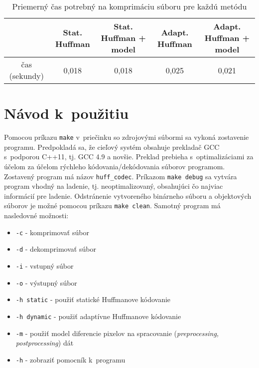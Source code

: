 \documentclass[10pt,a4paper]{article}
\begin{document}
\begin{table}[H]
	\begin{tabular}{|c|c|c|c|c|}
		\hline
		& Stat. Huffman & Stat. Huffman + model & Adapt. Huffman & Adapt. Huffman + model \\
		\hline
		čas (sekundy) & 0,018 & 0,018 & 0,025 & 0,021 \\
		\hline                            
	\end{tabular}
	\caption{Priemerný čas potrebný na komprimáciu súboru pre každú metódu}
\end{table}

\section{Návod k~použitiu}

Pomocou príkazu \texttt{make} v~priečinku so zdrojovými súbormi sa vykoná zostavenie programu. Predpokladá sa, že cieľový systém obsahuje prekladač GCC s~podporou C++11, tj. GCC 4.9 a novšie. Preklad prebieha s~optimalizáciami za účelom za účelom rýchleho kódovania/dekódovania súborov programom. Zostavený program má názov \texttt{huff\_codec}. Príkazom \texttt{make debug} sa vytvára program vhodný na ladenie, tj. neoptimalizovaný, obsahujúci čo najviac informácií pre ladenie. Odstránenie vytvoreného binárneho súboru a objektových súborov je možné pomocou príkazu \texttt{make clean}. Samotný program má nasledovné možnosti:
\begin{itemize}
	\item \texttt{-c} \-- komprimovať súbor
	\item \texttt{-d} \-- dekomprimovať súbor
	\item \texttt{-i} \-- vstupný súbor
	\item \texttt{-o} \-- výstupný súbor
	\item \texttt{-h static} \-- použiť statické Huffmanove kódovanie
	\item \texttt{-h dynamic} \-- použiť adaptívne Huffmanove kódovanie
	\item \texttt{-m} \-- použiť model diferencie pixelov na spracovanie (\textit{preprocessing, postprocessing}) dát
	\item \texttt{-h} \-- zobraziť pomocník k~programu
\end{itemize}
\end{document}
